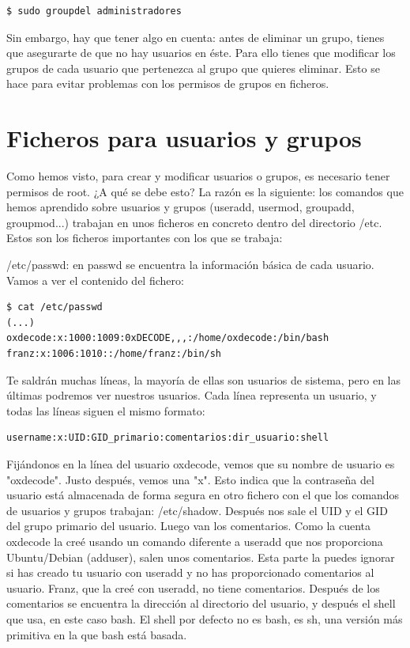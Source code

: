 \begin{tcolorbox-code}
\begin{lstlisting}
$ sudo groupdel administradores
\end{lstlisting}
\end{tcolorbox-code}

Sin embargo, hay que tener algo en cuenta: antes de eliminar un grupo, tienes que asegurarte de que no hay usuarios en éste. Para ello tienes que modificar los grupos de cada usuario que pertenezca al grupo que quieres eliminar. Esto se hace para evitar problemas con los permisos de grupos en ficheros.

\section{Ficheros para usuarios y grupos}
Como hemos visto, para crear y modificar usuarios o grupos, es necesario tener permisos de root. ¿A qué se debe esto? La razón es la siguiente: los comandos que hemos aprendido sobre usuarios y grupos (useradd, usermod, groupadd, groupmod...) trabajan en unos ficheros en concreto dentro del directorio /etc. Estos son los ficheros importantes con los que se trabaja:

/etc/passwd: en passwd se encuentra la información básica de cada usuario. Vamos a ver el contenido del fichero:

\begin{tcolorbox-code}
\begin{lstlisting}
$ cat /etc/passwd
(...)
oxdecode:x:1000:1009:0xDECODE,,,:/home/oxdecode:/bin/bash
franz:x:1006:1010::/home/franz:/bin/sh
\end{lstlisting}
\end{tcolorbox-code}

Te saldrán muchas líneas, la mayoría de ellas son usuarios de sistema, pero en las últimas podremos ver nuestros usuarios.
Cada línea representa un usuario, y todas las líneas siguen el mismo formato:

\begin{tcolorbox-code}
\begin{lstlisting}
username:x:UID:GID_primario:comentarios:dir_usuario:shell
\end{lstlisting}
\end{tcolorbox-code}

Fijándonos en la línea del usuario oxdecode, vemos que su nombre de usuario es "oxdecode". Justo después, vemos una "x". Esto indica que la contraseña del usuario está almacenada de forma segura en otro fichero con el que los comandos de usuarios y grupos trabajan: /etc/shadow. Después nos sale el UID y el GID del grupo primario del usuario. Luego van los comentarios. Como la cuenta oxdecode la creé usando un comando diferente a useradd que nos proporciona Ubuntu/Debian (adduser), salen unos comentarios. Esta parte la puedes ignorar si has creado tu usuario con useradd y no has proporcionado comentarios al usuario. Franz, que la creé con useradd, no tiene comentarios. Después de los comentarios se encuentra la dirección al directorio del usuario, y después el shell que usa, en este caso bash. El shell por defecto no es bash, es sh, una versión más primitiva en la que bash está basada.

